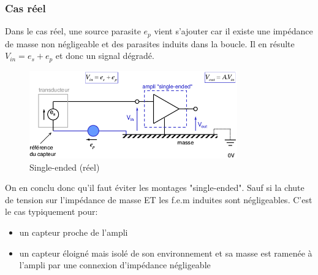 \subsubsection{Cas réel}
Dans le cas réel, une source parasite \(e_p\) vient s'ajouter car il existe une impédance de masse non négligeable et des parasites induits dans la boucle. Il en résulte \(V_{in} = e_s + e_p\) et donc un signal dégradé.
\begin{figure}[H]
	\centering 
	\includegraphics[width=0.8\textwidth,height=10\baselineskip,keepaspectratio]{ch3/image12} 
	\caption{Single-ended (réel)} 
\end{figure}
On en conclu donc qu'il faut éviter les montages "single-ended". Sauf si la chute de tension sur l'impédance de masse ET les f.e.m induites sont négligeables. C'est le cas typiquement pour:
\begin{itemize}
	\item un capteur proche de l'ampli
	\item un capteur éloigné mais isolé de son environnement et sa masse est ramenée à l'ampli par une connexion d'impédance négligeable
\end{itemize}
